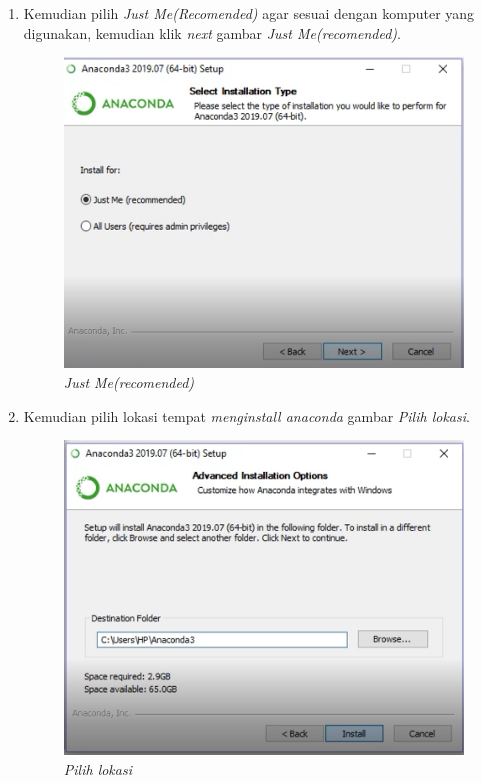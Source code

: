 \begin{enumerate}
\item Kemudian pilih \textit{Just Me(Recomended)} agar sesuai dengan komputer yang digunakan, kemudian klik \textit{next}
 gambar \textit{Just Me(recomended)}.

\begin{figure}[H]
    \centering
    \includegraphics[scale=0.5]{figures/5}
    \caption{\textit{Just Me(recomended)}}
    \label{Figureanaconda4}
\end{figure}


\item Kemudian pilih lokasi tempat \textit{menginstall anaconda}
 gambar \textit{Pilih lokasi}.

\begin{figure}[H]
    \centering
    \includegraphics[scale=0.5]{figures/6}
    \caption{\textit{Pilih lokasi}}
    \label{Figureanaconda5}
\end{figure}


\end{enumerate}

